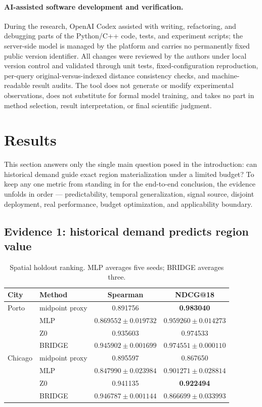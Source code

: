 \documentclass[5p,twocolumn,authoryear]{elsarticle}
\newenvironment{paperwidetable}{\begin{table}[t]}{\end{table}}
\newenvironment{paperwidetable}{\begin{table}[H]}{\end{table}}
\newcommand{\zmethod}{Z0}
\newcommand{\gmethod}{BRIDGE}
\begin{document}
\paragraph{AI-assisted software development and verification.}
During the research, OpenAI Codex assisted with writing, refactoring, and debugging parts
of the Python/C++ code, tests, and experiment scripts; the server-side model is managed by
the platform and carries no permanently fixed public version identifier. All changes were
reviewed by the authors under local version control and validated through unit tests,
fixed-configuration reproduction, per-query original-versus-indexed distance consistency
checks, and machine-readable result audits. The tool does not generate or modify
experimental observations, does not substitute for formal model training, and takes no
part in method selection, result interpretation, or final scientific judgment.

\section{Results}

This section answers only the single main question posed in the introduction: can
historical demand guide exact region materialization under a limited budget? To keep any
one metric from standing in for the end-to-end conclusion, the evidence unfolds in order
--- predictability, temporal generalization, signal source, disjoint deployment, real
performance, budget optimization, and applicability boundary.

\subsection{Evidence 1: historical demand predicts region value}

\begin{paperwidetable}
  \centering
  \caption{Spatial holdout ranking. MLP averages five seeds; \gmethod{} averages three.}
  \label{tab:holdout}
  \begin{tabular}{llcc}
    \toprule
    City & Method & Spearman & NDCG@18 \\
    \midrule
    Porto & midpoint proxy & 0.891756 & \textbf{0.983040} \\
           & MLP & $0.869552\pm0.019732$ & $0.959260\pm0.014273$ \\
           & \zmethod & 0.935603 & 0.974533 \\
           & \gmethod & $\mathbf{0.945902\pm0.001699}$ & $0.974551\pm0.000110$ \\
    \midrule
    Chicago & midpoint proxy & 0.895597 & 0.867650 \\
            & MLP & $0.847990\pm0.023984$ & $0.901271\pm0.028814$ \\
            & \zmethod & 0.941135 & \textbf{0.922494} \\
            & \gmethod & $\mathbf{0.946787\pm0.001144}$ & $0.866699\pm0.033993$ \\
    \bottomrule
  \end{tabular}
\end{paperwidetable}
\end{document}
